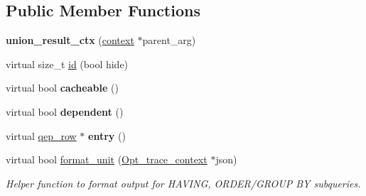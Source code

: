 \subsection*{Public Member Functions}
\begin{DoxyCompactItemize}
\item 
\mbox{\label{classopt__explain__json__namespace_1_1union__result__ctx_a4701bcff07a00a6903c0bc946261d271}} 
{\bfseries union\+\_\+result\+\_\+ctx} (\mbox{\hyperlink{classopt__explain__json__namespace_1_1context}{context}} $\ast$parent\+\_\+arg)
\item 
virtual size\+\_\+t \mbox{\hyperlink{classopt__explain__json__namespace_1_1union__result__ctx_af03161b8ce22f7a3e95489dd1be62118}{id}} (bool hide)
\item 
\mbox{\label{classopt__explain__json__namespace_1_1union__result__ctx_aac6c7b979783ad86859fbcb8f9809872}} 
virtual bool {\bfseries cacheable} ()
\item 
\mbox{\label{classopt__explain__json__namespace_1_1union__result__ctx_aed83f60c74c659fada9421732f2a5f7f}} 
virtual bool {\bfseries dependent} ()
\item 
\mbox{\label{classopt__explain__json__namespace_1_1union__result__ctx_a5cc4d5de0d66ce1c4ce55363fcbc34de}} 
virtual \mbox{\hyperlink{classqep__row}{qep\+\_\+row}} $\ast$ {\bfseries entry} ()
\item 
\mbox{\label{classopt__explain__json__namespace_1_1union__result__ctx_a109e413790caa8e5774b8a929d96f7af}} 
virtual bool \mbox{\hyperlink{classopt__explain__json__namespace_1_1union__result__ctx_a109e413790caa8e5774b8a929d96f7af}{format\+\_\+unit}} (\mbox{\hyperlink{classOpt__trace__context}{Opt\+\_\+trace\+\_\+context}} $\ast$json)
\begin{DoxyCompactList}\small\item\em Helper function to format output for H\+A\+V\+I\+NG, O\+R\+D\+E\+R/\+G\+R\+O\+UP BY subqueries. \end{DoxyCompactList}\item 
\mbox{\label{classopt__explain__json__namespace_1_1union__result__ctx_a8a396b87764fda89e46fb1b7bc8d860e}} 

\end{DoxyCompactItemize}
